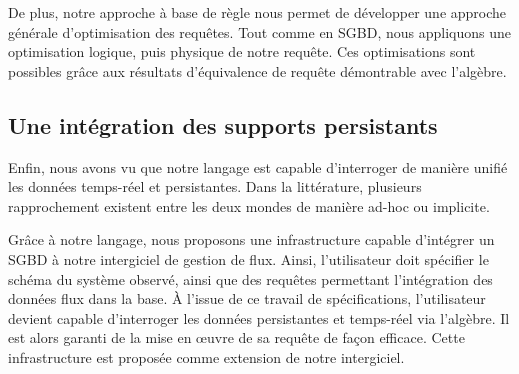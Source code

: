 De plus, notre approche à base de règle nous permet de développer une approche générale d'optimisation des requêtes. Tout comme en SGBD, nous appliquons une optimisation logique, puis physique de notre requête. Ces optimisations sont possibles grâce aux résultats d'équivalence de requête démontrable avec l'algèbre.

\subsection{Une intégration des supports persistants}
Enfin, nous avons vu que notre langage est capable d'interroger de manière unifié les données temps-réel et persistantes. Dans la littérature, plusieurs rapprochement existent entre les deux mondes de manière ad-hoc ou implicite.

Grâce à notre langage, nous proposons une infrastructure capable d'intégrer un SGBD à notre intergiciel de gestion de flux. Ainsi, l'utilisateur doit spécifier le schéma du système observé, ainsi que des requêtes permettant l'intégration des données flux dans la base. À l'issue de ce travail de spécifications, l'utilisateur devient capable d'interroger les données persistantes et temps-réel via l'algèbre. Il est alors garanti de la mise en œuvre de sa requête de façon efficace. Cette infrastructure est proposée comme extension de notre intergiciel.

